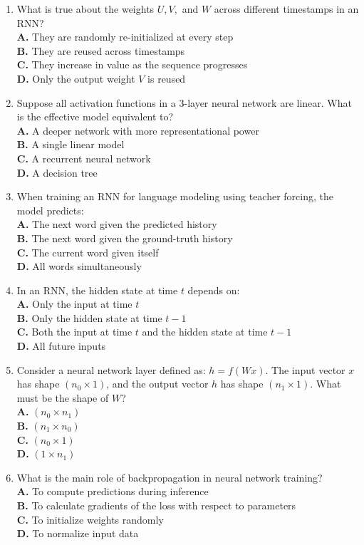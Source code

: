 \documentclass[11pt]{article}
\begin{document}
\begin{enumerate}[label=Q\arabic*., leftmargin=*]
\item What is true about the weights $U, V,$ and $W$ across different timestamps in an RNN?\\[0.25em]
\textbf{A.} They are randomly re-initialized at every step\\
\textbf{B.} They are reused across timestamps\\
\textbf{C.} They increase in value as the sequence progresses\\
\textbf{D.} Only the output weight $V$ is reused

\item Suppose all activation functions in a 3-layer neural network are linear. What is the effective model equivalent to?\\[0.25em]
\textbf{A.} A deeper network with more representational power\\
\textbf{B.} A single linear model\\
\textbf{C.} A recurrent neural network\\
\textbf{D.} A decision tree

\item When training an RNN for language modeling using teacher forcing, the model predicts:\\[0.25em]
\textbf{A.} The next word given the predicted history\\
\textbf{B.} The next word given the ground-truth history\\
\textbf{C.} The current word given itself\\
\textbf{D.} All words simultaneously

\item In an RNN, the hidden state at time $t$ depends on:\\[0.25em]
\textbf{A.} Only the input at time $t$\\
\textbf{B.} Only the hidden state at time $t-1$\\
\textbf{C.} Both the input at time $t$ and the hidden state at time $t-1$\\
\textbf{D.} All future inputs

\item Consider a neural network layer defined as: $h = f(Wx)$. The input vector $x$ has shape $(n_0 \times 1)$, and the output vector $h$ has shape $(n_1 \times 1)$. What must be the shape of $W$?\\[0.25em]
\textbf{A.} $(n_0 \times n_1)$\\
\textbf{B.} $(n_1 \times n_0)$\\
\textbf{C.} $(n_0 \times 1)$\\
\textbf{D.} $(1 \times n_1)$

\item What is the main role of backpropagation in neural network training?\\[0.25em]
\textbf{A.} To compute predictions during inference\\
\textbf{B.} To calculate gradients of the loss with respect to parameters\\
\textbf{C.} To initialize weights randomly\\
\textbf{D.} To normalize input data

\end{enumerate}
\end{document}
